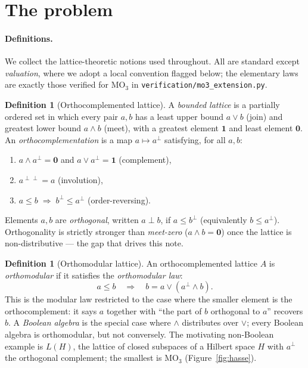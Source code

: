 \documentclass[11pt]{article}
\theoremstyle{definition}
\newtheorem{definition}[theorem]{Definition}
\begin{document}
\section{The problem}
\label{sec:problem}

\paragraph{Definitions.}
We collect the lattice-theoretic notions used throughout. All are
standard except \emph{valuation}, where we adopt a local convention
flagged below; the elementary laws are exactly those verified for
$\mathrm{MO}_3$ in \texttt{verification/mo3\_extension.py}.

\begin{definition}[Orthocomplemented lattice]\label{def:ocl}
A \emph{bounded lattice} is a partially ordered set in which every
pair $a,b$ has a least upper bound $a \vee b$ (join) and greatest
lower bound $a \wedge b$ (meet), with a greatest element $\mathbf 1$
and least element $\mathbf 0$. An \emph{orthocomplementation} is a map
$a \mapsto a^\perp$ satisfying, for all $a,b$:
\begin{enumerate}[label=(\roman*), noitemsep]
  \item $a \wedge a^\perp = \mathbf 0$ and $a \vee a^\perp = \mathbf 1$
    (complement),
  \item $a^{\perp\perp} = a$ (involution),
  \item $a \leq b \;\Rightarrow\; b^\perp \leq a^\perp$
    (order-reversing).
\end{enumerate}
Elements $a,b$ are \emph{orthogonal}, written $a \perp b$, if
$a \leq b^\perp$ (equivalently $b \leq a^\perp$). Orthogonality is
strictly stronger than \emph{meet-zero} ($a \wedge b = \mathbf 0$) once
the lattice is non-distributive --- the gap that drives this note.
\end{definition}

\begin{definition}[Orthomodular lattice]\label{def:oml}
An orthocomplemented lattice $A$ is \emph{orthomodular} if it
satisfies the \emph{orthomodular law}:
\begin{equation}\label{eq:oml-law}
  a \leq b \quad\Longrightarrow\quad b = a \vee (a^\perp \wedge b).
\end{equation}
This is the modular law restricted to the case where the smaller
element is the orthocomplement: it says $a$ together with ``the part of
$b$ orthogonal to $a$'' recovers $b$. A \emph{Boolean algebra} is the
special case where $\wedge$ distributes over $\vee$; every Boolean
algebra is orthomodular, but not conversely. The motivating
non-Boolean example is $L(H)$, the lattice of closed subspaces of a
Hilbert space $H$ with $a^\perp$ the orthogonal complement; the
smallest is $\mathrm{MO}_3$ (Figure~\ref{fig:hasse}).
\end{definition}
\end{document}
